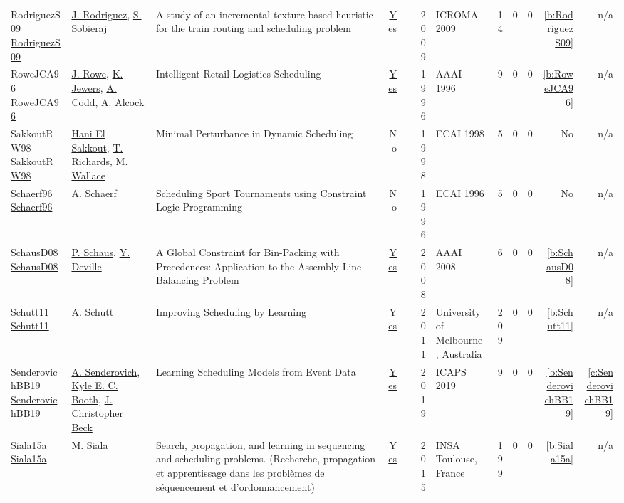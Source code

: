 {\begin{longtable}{>{\raggedright\arraybackslash}p{3cm}>{\raggedright\arraybackslash}p{6cm}>{\raggedright\arraybackslash}p{6.5cm}rrrp{2.5cm}rrrrr}
RodriguezS09 \href{}{RodriguezS09} & \hyperref[auth:a787]{J. Rodriguez}, \hyperref[auth:a1030]{S. Sobieraj} & A study of an incremental texture-based heuristic for the train routing and scheduling problem & \href{../works/RodriguezS09.pdf}{Yes} & \cite{RodriguezS09} & 2009 & ICROMA 2009 & 14 & 0 & 0 & \ref{b:RodriguezS09} & n/a\\
RoweJCA96 \href{http://www.aaai.org/Library/IAAI/1996/iaai96-280.php}{RoweJCA96} & \hyperref[auth:a1307]{J. Rowe}, \hyperref[auth:a1308]{K. Jewers}, \hyperref[auth:a1309]{A. Codd}, \hyperref[auth:a1310]{A. Alcock} & Intelligent Retail Logistics Scheduling & \href{../works/RoweJCA96.pdf}{Yes} & \cite{RoweJCA96} & 1996 & AAAI 1996 & 9 & 0 & 0 & \ref{b:RoweJCA96} & n/a\\
SakkoutRW98 \href{}{SakkoutRW98} & \hyperref[auth:a167]{Hani El Sakkout}, \hyperref[auth:a1288]{T. Richards}, \hyperref[auth:a1289]{M. Wallace} & Minimal Perturbance in Dynamic Scheduling & No & \cite{SakkoutRW98} & 1998 & ECAI 1998 & 5 & 0 & 0 & No & n/a\\
Schaerf96 \href{}{Schaerf96} & \hyperref[auth:a1284]{A. Schaerf} & Scheduling Sport Tournaments using Constraint Logic Programming & No & \cite{Schaerf96} & 1996 & ECAI 1996 & 5 & 0 & 0 & No & n/a\\
SchausD08 \href{http://www.aaai.org/Library/AAAI/2008/aaai08-058.php}{SchausD08} & \hyperref[auth:a148]{P. Schaus}, \hyperref[auth:a152]{Y. Deville} & A Global Constraint for Bin-Packing with Precedences: Application to the Assembly Line Balancing Problem & \href{../works/SchausD08.pdf}{Yes} & \cite{SchausD08} & 2008 & AAAI 2008 & 6 & 0 & 0 & \ref{b:SchausD08} & n/a\\
Schutt11 \href{https://www.a4cp.org/sites/default/files/andreas_schutt_-_improving_scheduling_by_learning.pdf}{Schutt11} & \hyperref[auth:a125]{A. Schutt} & Improving Scheduling by Learning & \href{../works/Schutt11.pdf}{Yes} & \cite{Schutt11} & 2011 & University of Melbourne, Australia & 209 & 0 & 0 & \ref{b:Schutt11} & n/a\\
SenderovichBB19 \href{https://ojs.aaai.org/index.php/ICAPS/article/view/3504}{SenderovichBB19} & \hyperref[auth:a1396]{A. Senderovich}, \hyperref[auth:a208]{Kyle E. C. Booth}, \hyperref[auth:a89]{J. Christopher Beck} & Learning Scheduling Models from Event Data & \href{../works/SenderovichBB19.pdf}{Yes} & \cite{SenderovichBB19} & 2019 & ICAPS 2019 & 9 & 0 & 0 & \ref{b:SenderovichBB19} & \ref{c:SenderovichBB19}\\
Siala15a \href{https://tel.archives-ouvertes.fr/tel-01164291}{Siala15a} & \hyperref[auth:a130]{M. Siala} & Search, propagation, and learning in sequencing and scheduling problems. (Recherche, propagation et apprentissage dans les probl{\`{e}}mes de s{\'{e}}quencement et d'ordonnancement) & \href{../works/Siala15a.pdf}{Yes} & \cite{Siala15a} & 2015 & {INSA} Toulouse, France & 199 & 0 & 0 & \ref{b:Siala15a} & n/a\\

\end{longtable}}
